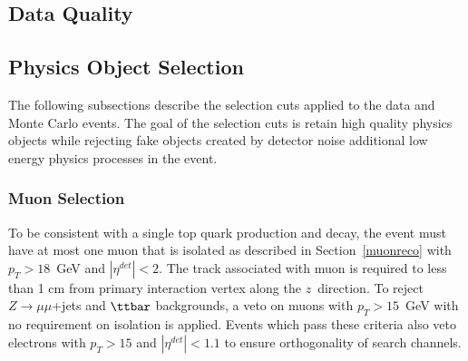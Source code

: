 \subsection{Data Quality}
\label{dataquality}

\subsection{Physics Object Selection}
\label{objectselection}

The following subsections describe the selection cuts applied to the data and Monte Carlo events. The goal of the selection cuts is retain high quality physics objects while rejecting fake objects created by detector noise additional low energy physics processes in the event.

\subsubsection{Muon Selection}
\label{muonselection}

To be consistent with a single top quark production and decay, the event must have at most one muon that is isolated as described in Section~\ref{muonreco} with $p_{T}>18$~GeV and $|\eta^{det}|<2$. The track associated with muon is required to less than 1 cm from primary interaction vertex along the $z$~direction. To reject $Z\rightarrow\mu\mu$+jets and $\ttbar$ backgrounds, a veto on muons with $p_{T}>15$~GeV with no requirement on isolation is applied. Events which pass these criteria also veto electrons with $p_{T}>15$ and $|\eta^{det}|<1.1$ to ensure orthogonality of search channels.



